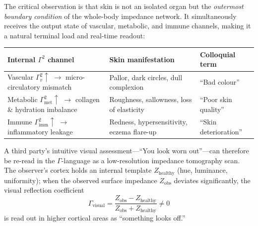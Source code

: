 \documentclass[aps,pre,twocolumn,superscriptaddress,floatfix]{revtex4-2}
\begin{document}
The critical observation is that skin is not an
isolated organ but the \emph{outermost boundary
condition} of the whole-body impedance network.
It simultaneously receives the output state of
vascular, metabolic, and immune channels,
making it a natural terminal load and
real-time readout:
%
\begin{center}
\begin{tabular}{lll}
\toprule
Internal $\Gamma^2$ channel & Skin manifestation &
  Colloquial term \\
\midrule
Vascular $\Gamma_v^2\!\uparrow$
  $\to$ micro-circulatory mismatch &
  Pallor, dark circles, dull complexion &
  ``Bad colour'' \\
Metabolic $\Gamma_{\text{met}}^2\!\uparrow$
  $\to$ collagen \& hydration imbalance &
  Roughness, sallowness, loss of elasticity &
  ``Poor skin quality'' \\
Immune $\Gamma_{\text{imm}}^2\!\uparrow$
  $\to$ inflammatory leakage &
  Redness, hypersensitivity, eczema flare-up &
  ``Skin deterioration'' \\
\bottomrule
\end{tabular}
\end{center}
%
A third party's intuitive visual assessment---``You
look worn out''---can therefore be re-read in the
$\Gamma$-language as a low-resolution impedance
tomography scan. The observer's cortex holds an
internal template
$Z_{\text{healthy}}$ (hue, luminance, uniformity);
when the observed surface impedance
$Z_{\text{obs}}$ deviates significantly, the visual
reflection coefficient
%
\begin{equation}
  \Gamma_{\text{visual}}
  = \frac{Z_{\text{obs}} - Z_{\text{healthy}}}
         {Z_{\text{obs}} + Z_{\text{healthy}}}
  \neq 0
  \label{eq:visual-gamma}
\end{equation}
%
is read out in higher cortical areas as
``something looks off.''
\end{document}
